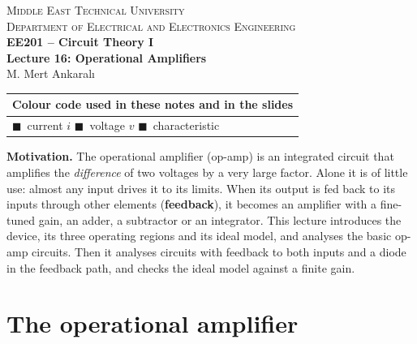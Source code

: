 \documentclass[11pt,a4paper]{article}
\newcommand{\Icol}[1]{\textcolor{ccur}{#1}}
\newcommand{\Vcol}[1]{\textcolor{cvolt}{#1}}
\begin{document}
\begin{center}
\begin{tcolorbox}[enhanced, colback=metured!5, colframe=metured, boxrule=1pt,
                  arc=3pt, left=10pt,right=10pt,top=7pt,bottom=7pt, width=\textwidth]
\begin{center}
  {\small\scshape Middle East Technical University}\\[2pt]
  {\small\scshape Department of Electrical and Electronics Engineering}\\[7pt]
  {\Large\bfseries\color{metured} EE201 -- Circuit Theory I}\\[4pt]
  {\large\bfseries Lecture 16: Operational Amplifiers}\\[6pt]
  {\small M. Mert Ankaral{\i}}
\end{center}
\end{tcolorbox}
\end{center}
\vspace{-0.5em}

\begin{center}
\small
\begin{tabular}{@{}l@{}}
\toprule
\textbf{Colour code used in these notes and in the slides}\\
\midrule
\Icol{$\blacksquare$}~current $i$ \quad
\Vcol{$\blacksquare$}~voltage $v$ \quad
\textcolor{metured}{$\blacksquare$}~characteristic\\
\bottomrule
\end{tabular}
\end{center}

\textbf{Motivation.} The operational amplifier (op-amp) is an integrated circuit that amplifies
the \emph{difference} of two voltages by a very large factor. Alone it is of little use: almost
any input drives it to its limits. When its output is fed back to its inputs through other
elements (\textbf{feedback}), it becomes an amplifier with a fine-tuned gain, an adder, a subtractor or an integrator. This lecture introduces the device, its
three operating regions and its ideal model, and analyses the basic op-amp circuits. Then it analyses circuits with feedback to both inputs and
a diode in the feedback path, and checks the ideal model against a finite gain.

\section{The operational amplifier}
\end{document}
